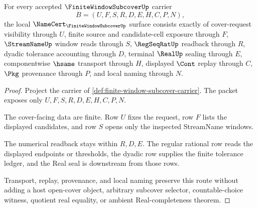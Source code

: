 \begin{theorem}
\label{thm:finite-window-subcover-namecert-obligations}
For every accepted $\FiniteWindowSubcoverUp$ carrier
$$
B=(U,F,S,R,D,E,H,C,P,N),
$$
the local $\NameCert_{\FiniteWindowSubcoverUp}$ surface consists exactly of cover-request visibility through $U$, finite source and candidate-cell exposure through $F$, $\StreamNameUp$ window reads through $S$, $\RegSeqRatUp$ readback through $R$, dyadic tolerance accounting through $D$, terminal $\RealUp$ sealing through $E$, componentwise $\hsame$ transport through $H$, displayed $\Cont$ replay through $C$, $\Pkg$ provenance through $P$, and local naming through $N$.
\end{theorem}
\begin{proof}
Project the carrier of \autoref{def:finite-window-subcover-carrier}. The packet exposes only $U,F,S,R,D,E,H,C,P,N$.

The cover-facing data are finite. Row $U$ fixes the request, row $F$ lists the displayed candidates, and row $S$ opens only the inspected StreamName windows.

The numerical readback stays within $R,D,E$. The regular rational row reads the displayed endpoints or thresholds, the dyadic row supplies the finite tolerance ledger, and the Real seal is downstream from those rows.

Transport, replay, provenance, and local naming preserve this route without adding a host open-cover object, arbitrary subcover selector, countable-choice witness, quotient real equality, or ambient Real-completeness theorem.
\end{proof}


